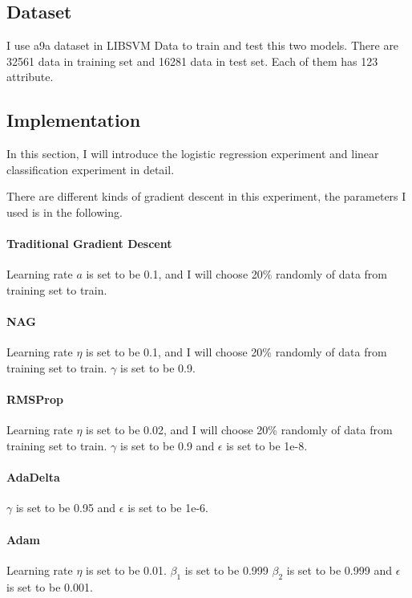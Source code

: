 \documentclass[journal, a4paper]{IEEEtran}
\begin{document}
\subsection{Dataset}
I use a9a dataset in LIBSVM Data to train and test this two models. There are 32561 data in training set and 16281 data in test set. Each of them has 123 attribute.

\subsection{Implementation}
In this section, I will introduce the logistic regression experiment and linear classification experiment in detail.

There are different kinds of gradient descent in this experiment, the parameters I used is in the following.

\paragraph{Traditional Gradient Descent} Learning rate $a$ is set to be 0.1, and I will choose 20\% randomly of data from training set to train.

\paragraph{NAG} Learning rate $\eta$ is set to be 0.1, and I will choose 20\% randomly of data from training set to train. $\gamma$ is set to be 0.9.

\paragraph{RMSProp} Learning rate $\eta$ is set to be 0.02, and I will choose 20\% randomly of data from training set to train. $\gamma$ is set to be 0.9 and $\epsilon$ is set to be 1e-8.

\paragraph{AdaDelta} $\gamma$ is set to be 0.95 and $\epsilon$ is set to be 1e-6.

\paragraph{Adam} Learning rate $\eta$ is set to be 0.01. $\beta_1$ is set to be 0.999 $\beta_2$ is set to be 0.999 and $\epsilon$ is set to be 0.001.
\end{document}

